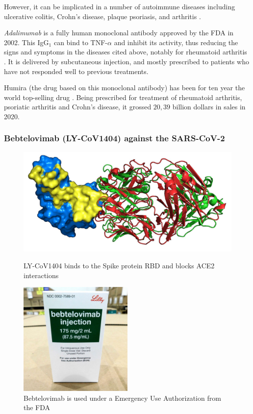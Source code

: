 However, it can be implicated in a number of autoimmune diseases including
ulcerative colitis, Crohn’s disease, plaque psoriasis, and arthritis
\cite{noauthor_adalimumab_2021}.

\emph{Adalimumab} is a fully human monoclonal antibody approved by the FDA in 2002.
This IgG$_1$ can bind to TNF-$\alpha$ and inhibit its activity, thus reducing the 
signs and symptoms in the diseases cited above, notably for rheumatoid arthritis
\cite{mease_adalimumab_2007}. It is delivered by subcutaneous injection, and mostly
prescribed to patients who have not responded well to previous treatments.

Humira (the drug based on this monoclonal antibody) has been for ten year
the world top-selling drug \cite{fierce_pharma_humira_2021}.
Being prescribed for treatment of rheumatoid arthritis, psoriatic arthritis and Crohn’s disease,
it grossed $20,39$ billion dollars in sales in 2020.


\subsubsection{Bebtelovimab (LY-CoV1404) against the SARS-CoV-2}
\begin{figure}[H]
    \begin{minipage}{0.49\textwidth}
        \centering
        \includegraphics[width=\textwidth]{../Images/LY-CoV1404_spike_protein.png}
        \caption{LY-CoV1404 binds to the Spike protein RBD and blocks ACE2 interactions}
        \label{fig:LY-CoV1404_spike_protein}
    \end{minipage}\hfill
    \begin{minipage}{0.49\textwidth}
        \centering
        \includegraphics[width=0.5\textwidth]{../Images/bebtelovimab.jpg}   
        \caption{Bebtelovimab is used under a Emergency Use Authorization from the FDA}
        \label{fig:bebtelovimab}
    \end{minipage}
\end{figure}

